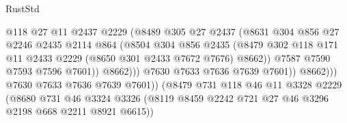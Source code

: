 \begin{lexlean}{RustStd}
\begin{coremodule}
                                        @118
                                        @27
                                        @11
                                        @2437
                                        @2229
                                        (@8489
                                          @305
                                          @27
                                          @2437
                                          (@8631
                                            @304
                                            @856
                                            @27
                                            @2246
                                            @2435
                                            @2114
                                            @864
                                            (@8504
                                              @304
                                              @856
                                              @2435
                                              (@8479
                                                @302
                                                @118
                                                @171
                                                @11
                                                @2433
                                                @2229
                                                (@8650 @301 @2433 @7672 @7676)
                                                @8662))
                                            @7587
                                            @7590
                                            @7593
                                            @7596
                                            @7601))
                                        @8662)))
                                  @7630
                                  @7633
                                  @7636
                                  @7639
                                  @7601))
                              @8662)))
                        @7630
                        @7633
                        @7636
                        @7639
                        @7601))
                    (@8479
                      @731
                      @118
                      @46
                      @11
                      @3328
                      @2229
                      (@8680
                        @731
                        @46
                        @3324
                        @3326
                        (@8119 @8459 @2242 @721 @27 @46 @3296 @2198 @668 @2211 @8921 @6615))

\end{coremodule}
\end{lexlean}
